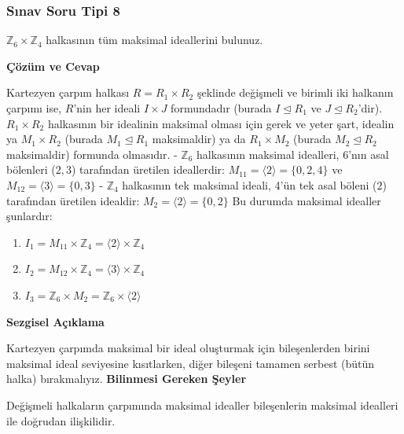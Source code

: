 \documentclass[11pt, a4paper]{article}
\newenvironment{cozum}{
    \vspace{0.5cm}
    \noindent\textcolor{green!60!black}{\faCheckCircle\enspace \textbf{\Large Çözüm ve Cevap}}\par\vspace{0.2cm}
}{}
\newenvironment{sezgisel}{
    \vspace{0.5cm}
    \noindent\textcolor{orange!80!black}{\faLightbulb\enspace \textbf{\Large Sezgisel Açıklama}}\par\vspace{0.2cm}
    \itshape
}{}
\newenvironment{bilgi}{
    \vspace{0.5cm}
    \noindent\textcolor{red!70!black}{\faExclamationTriangle\enspace \textbf{\Large Bilinmesi Gereken Şeyler}}\par\vspace{0.2cm}
}{}
\begin{document}
\subsubsection{Sınav Soru Tipi 8}
\begin{sinavbox}
$\mathbb{Z}_{6} \times \mathbb{Z}_{4}$ halkasının tüm maksimal ideallerini bulunuz.
\end{sinavbox}
\begin{cozum}
Kartezyen çarpım halkası $R = R_1 \times R_2$ şeklinde değişmeli ve birimli iki halkanın çarpımı ise, $R$'nin her ideali $I \times J$ formundadır (burada $I \unlhd R_1$ ve $J \unlhd R_2$'dir).
$R_1 \times R_2$ halkasının bir idealinin maksimal olması için gerek ve yeter şart, idealin ya $M_1 \times R_2$ (burada $M_1 \unlhd R_1$ maksimaldir) ya da $R_1 \times M_2$ (burada $M_2 \unlhd R_2$ maksimaldir) formunda olmasıdır.
- $\mathbb{Z}_6$ halkasının maksimal idealleri, 6'nın asal bölenleri ($2, 3$) tarafından üretilen ideallerdir:
  $M_{11} = \langle 2 \rangle = \{0, 2, 4\}$ ve $M_{12} = \langle 3 \rangle = \{0, 3\}$
- $\mathbb{Z}_4$ halkasının tek maksimal ideali, 4'ün tek asal böleni ($2$) tarafından üretilen idealdir:
  $M_2 = \langle 2 \rangle = \{0, 2\}$
Bu durumda maksimal idealler şunlardır:
\begin{enumerate}
    \item $I_1 = M_{11} \times \mathbb{Z}_4 = \langle 2 \rangle \times \mathbb{Z}_4$
    \item $I_2 = M_{12} \times \mathbb{Z}_4 = \langle 3 \rangle \times \mathbb{Z}_4$
    \item $I_3 = \mathbb{Z}_6 \times M_2 = \mathbb{Z}_6 \times \langle 2 \rangle$
\end{enumerate}
\end{cozum}
\begin{sezgisel}
Kartezyen çarpımda maksimal bir ideal oluşturmak için bileşenlerden birini maksimal ideal seviyesine kısıtlarken, diğer bileşeni tamamen serbest (bütün halka) bırakmalıyız.
\end{sezgisel}
\begin{bilgi}
Değişmeli halkaların çarpımında maksimal idealler bileşenlerin maksimal idealleri ile doğrudan ilişkilidir.
\end{bilgi}

\newpage
\end{document}

